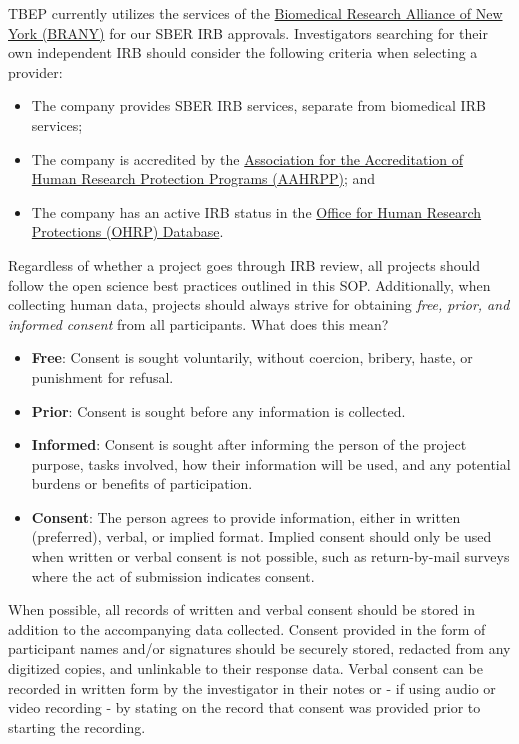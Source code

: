 \documentclass[
]{book}
\providecommand{\tightlist}{%
  \setlength{\itemsep}{0pt}\setlength{\parskip}{0pt}}
\begin{document}
TBEP currently utilizes the services of the \href{https://www.brany.com/sber-irb/}{Biomedical Research Alliance of New York (BRANY)} for our SBER IRB approvals. Investigators searching for their own independent IRB should consider the following criteria when selecting a provider:

\begin{itemize}
\tightlist
\item
  The company provides SBER IRB services, separate from biomedical IRB services;
\item
  The company is accredited by the \href{https://www.aahrpp.org/}{Association for the Accreditation of Human Research Protection Programs (AAHRPP)}; and
\item
  The company has an active IRB status in the \href{https://ohrp.cit.nih.gov/search/irbsearch.aspx?styp=bsc}{Office for Human Research Protections (OHRP) Database}.
\end{itemize}

Regardless of whether a project goes through IRB review, all projects should follow the open science best practices outlined in this SOP. Additionally, when collecting human data, projects should always strive for obtaining \emph{free, prior, and informed consent} from all participants. What does this mean?

\begin{itemize}
\tightlist
\item
  \textbf{Free}: Consent is sought voluntarily, without coercion, bribery, haste, or punishment for refusal.
\item
  \textbf{Prior}: Consent is sought before any information is collected.
\item
  \textbf{Informed}: Consent is sought after informing the person of the project purpose, tasks involved, how their information will be used, and any potential burdens or benefits of participation.
\item
  \textbf{Consent}: The person agrees to provide information, either in written (preferred), verbal, or implied format. Implied consent should only be used when written or verbal consent is not possible, such as return-by-mail surveys where the act of submission indicates consent.
\end{itemize}

When possible, all records of written and verbal consent should be stored in addition to the accompanying data collected. Consent provided in the form of participant names and/or signatures should be securely stored, redacted from any digitized copies, and unlinkable to their response data. Verbal consent can be recorded in written form by the investigator in their notes or - if using audio or video recording - by stating on the record that consent was provided prior to starting the recording.
\end{document}
